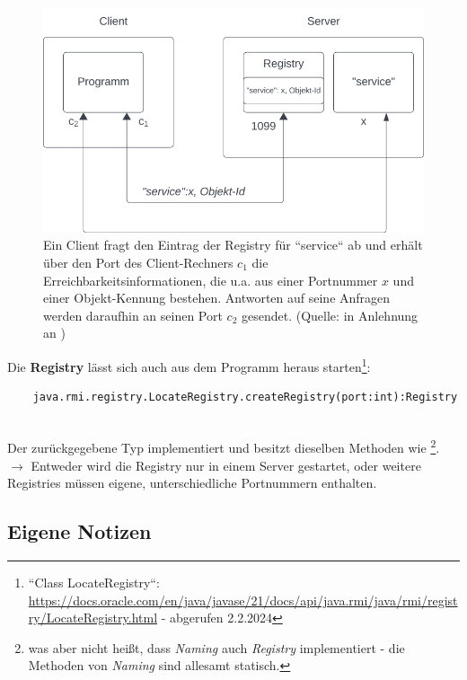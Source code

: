 \begin{figure}
    \centering
    \includegraphics[scale=0.5]{chapters/fopt5/img/rmi/registry}
    \caption{Ein Client fragt den Eintrag der Registry für ``service`` ab und erhält über den Port des Client-Rechners $c_1$ die Erreichbarkeitsinformationen, die u.a. aus einer Portnummer $x$ und einer Objekt-Kennung bestehen.
    Antworten auf seine Anfragen werden daraufhin an seinen Port $c_2$ gesendet. (Quelle: in Anlehnung an \cite[324, Bild 6.5]{Oec22})}
    \label{fig:registry}
\end{figure}

Die \textbf{Registry} lässt sich auch aus dem Programm heraus starten\footnote{
``Class LocateRegistry``: \url{https://docs.oracle.com/en/java/javase/21/docs/api/java.rmi/java/rmi/registry/LocateRegistry.html} - abgerufen 2.2.2024
}:

\begin{verbatim}
    java.rmi.registry.LocateRegistry.createRegistry(port:int):Registry
\end{verbatim}\\

\noindent
Der zurückgegebene Typ implementiert  und besitzt dieselben Methoden wie \footnote{was aber nicht heißt, dass \textit{Naming} auch \textit{Registry} implementiert - die Methoden von \textit{Naming} sind allesamt statisch.
}.\\
$\rightarrow$ Entweder wird die Registry nur in einem Server gestartet, oder weitere Registries müssen eigene, unterschiedliche Portnummern enthalten.

\subsection*{Eigene Notizen}

